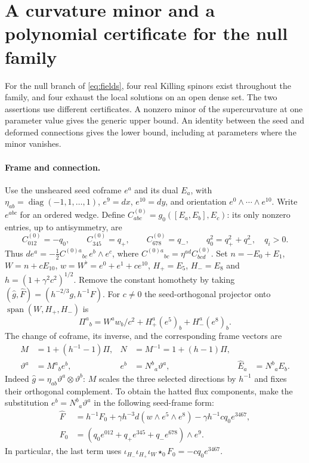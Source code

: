 \section{A curvature minor and a polynomial certificate for the null family}\label{app:certificate}

For the null branch of \eqref{eq:fields}, four real Killing spinors exist
throughout the family, and four exhaust the local solutions on an open dense
set. The two assertions use different certificates. A nonzero minor of the
supercurvature at one parameter value gives the generic upper bound. An
identity between the seed and deformed connections gives the lower bound,
including at parameters where the minor vanishes.

\paragraph{Frame and connection.}
Use the unsheared seed coframe $e^a$ and its dual $E_a$, with
$\eta_{ab}=\operatorname{diag}(-1,1,\ldots,1)$, $e^9=dx$, $e^{10}=dy$,
and orientation $e^0\wedge\cdots\wedge e^{10}$. Write $e^{abc}$ for an
ordered wedge. Define $C^{(0)}_{abc}=g_0([E_a,E_b],E_c)$: its only
nonzero entries, up to antisymmetry, are
\[
 C^{(0)}_{012}=-q_0,\qquad C^{(0)}_{345}=q_+,\qquad C^{(0)}_{678}=q_-,
 \qquad q_0^2=q_+^2+q_-^2,\quad q_i>0 .
\]
Thus $de^a=-\tfrac12 C^{(0)a}{}_{bc}\,e^b\wedge e^c$, where
$C^{(0)a}{}_{bc}=\eta^{ad}C^{(0)}_{bcd}$. Set $n=-E_0+E_1$,
$W=n+cE_{10}$, $w=W^\flat=e^0+e^1+c e^{10}$, $H_+=E_5$, $H_-=E_8$ and
$h=(1+\gamma^2c^2)^{1/2}$. Remove the constant homothety by taking
$(\hat g,\hat F)=(h^{-2/3}g,h^{-1}F)$. For $c\ne0$ the seed-orthogonal
projector onto $\operatorname{span}(W,H_+,H_-)$ is
\[
 \Pi^a{}_b=W^a w_b/c^2+H_+^a(e^5)_b+H_-^a(e^8)_b .
\]
The change of coframe, its inverse, and the corresponding frame vectors are
\begin{align*}
 M&=1+(h^{-1}-1)\Pi, & N&=M^{-1}=1+(h-1)\Pi,\\
 \vartheta^a&=M^a{}_b e^b, & e^b&=N^b{}_a\vartheta^a,
 &\widehat E_a&=N^b{}_a E_b .
\end{align*}
Indeed $\hat g=\eta_{ab}\vartheta^a\otimes\vartheta^b$: $M$ scales the
three selected directions by $h^{-1}$ and fixes their orthogonal complement.
To obtain the hatted flux components, make the substitution
$e^b=N^b{}_a\vartheta^a$ in the following seed-frame form:
\begin{align*}
 \hat F&=h^{-1}F_0+\gamma h^{-3}d(w\wedge e^5\wedge e^8)
               -\gamma h^{-1}c q_0 e^{3467},\\
 F_0&=(q_0e^{012}+q_+e^{345}+q_-e^{678})\wedge e^9 .
\end{align*}
In particular, the last term uses
$\iota_{H_-}\iota_{H_+}\iota_W\star_0 F_0=-c q_0e^{3467}$.


